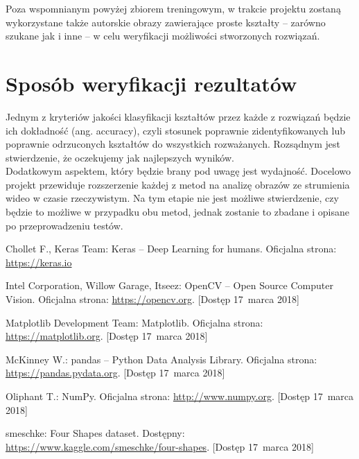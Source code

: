 \documentclass[11pt,a4paper]{article}
\begin{document}
Poza wspomnianym powyżej zbiorem treningowym, w trakcie projektu zostaną wykorzystane także autorskie obrazy zawierające proste kształty -- zarówno szukane jak i inne -- w celu weryfikacji możliwości stworzonych rozwiązań.

\section{Sposób weryfikacji rezultatów} %

Jednym z kryteriów jakości klasyfikacji kształtów przez każde z rozwiązań będzie ich dokładność (ang. accuracy), czyli stosunek poprawnie zidentyfikowanych lub poprawnie odrzuconych kształtów do wszystkich rozważanych. Rozsądnym jest stwierdzenie, że oczekujemy jak najlepszych wyników.\\

Dodatkowym aspektem, który będzie brany pod uwagę jest wydajność. Docelowo projekt przewiduje rozszerzenie każdej z metod na analizę obrazów ze strumienia wideo w czasie rzeczywistym. Na tym etapie nie jest możliwe stwierdzenie, czy będzie to możliwe w przypadku obu metod, jednak zostanie to zbadane i opisane po przeprowadzeniu testów.

\begin{thebibliography}{9} %

        Chollet F., Keras Team:
        Keras -- Deep Learning for humans.
        Oficjalna strona: \url{https://keras.io}

        Intel Corporation, Willow Garage, Itseez:
        OpenCV -- Open Source Computer Vision.
        Oficjalna strona: \url{https://opencv.org}.
        [Dostęp 17~marca 2018]

        Matplotlib Development Team:
        Matplotlib.
        Oficjalna strona: \url{https://matplotlib.org}.
        [Dostęp 17~marca 2018]

        McKinney W.:
        pandas -- Python Data Analysis Library.
        Oficjalna strona: \url{https://pandas.pydata.org}.
        [Dostęp 17~marca 2018]

        Oliphant T.:
        NumPy.
        Oficjalna strona: \url{http://www.numpy.org}.
        [Dostęp 17~marca 2018]

        smeschke:
        Four Shapes dataset.
        Dostępny: \url{https://www.kaggle.com/smeschke/four-shapes}.
        [Dostęp 17~marca 2018]

\end{thebibliography}
\end{document}
